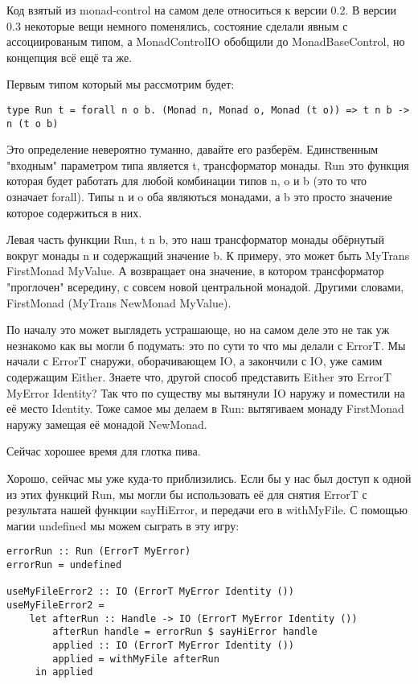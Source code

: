 \begin{remark}
Код взятый из monad-control на самом деле относиться к версии 0.2. В версии 0.3
некоторые вещи немного поменялись, состояние сделали явным с ассоциированым
типом, а MonadControlIO обобщили до MonadBaseControl, но концепция всё ещё та
же.
\end{remark}

Первым типом который мы рассмотрим будет:

\begin{lstlisting}
type Run t = forall n o b. (Monad n, Monad o, Monad (t o)) => t n b -> n (t o b)
\end{lstlisting}

Это определение невероятно туманно, давайте его разберём. Единственным
"входным" параметром типа является t, трансформатор монады. Run это функция
которая будет работать для любой комбинации типов n, o и b (это то что означает
forall). Типы n и o оба являються монадами, а b это просто значение которое
содержиться в них.

Левая часть функции Run, t n b, это наш трансформатор монады обёрнутый вокруг
монады n и содержащий значение b. К примеру, это может быть MyTrans FirstMonad
MyValue. А возвращает она значение, в котором трансформатор "проглочен"
всередину, с совсем новой центральной монадой. Другими словами, FirstMonad
(MyTrans NewMonad MyValue). 

По началу это может выглядеть устрашающе, но на самом деле это не так уж
незнакомо как вы могли б подумать: это по сути то что мы делали с ErrorT. Мы
начали с ErrorT снаружи, оборачивающем IO, а закончили с IO, уже самим
содержащим Either. Знаете что, другой способ представить Either это ErrorT
MyError Identity? Так что по существу мы вытянули IO наружу и поместили на её
место Identity. Тоже самое мы делаем в Run: вытягиваем монаду FirstMonad наружу
замещая её монадой NewMonad.

\begin{remark}
Сейчас хорошее время для глотка пива.
\end{remark}

Хорошо, сейчас мы уже куда-то приблизились. Если бы у нас был доступ к одной из
этих функций Run, мы могли бы использовать её для снятия ErrorT с результата
нашей функции sayHiError, и передачи его в withMyFile. С помощью магии
undefined мы можем сыграть в эту игру:

\begin{lstlisting}
errorRun :: Run (ErrorT MyError)
errorRun = undefined

useMyFileError2 :: IO (ErrorT MyError Identity ())
useMyFileError2 =
    let afterRun :: Handle -> IO (ErrorT MyError Identity ())
        afterRun handle = errorRun $ sayHiError handle
        applied :: IO (ErrorT MyError Identity ())
        applied = withMyFile afterRun
     in applied
\end{lstlisting}

